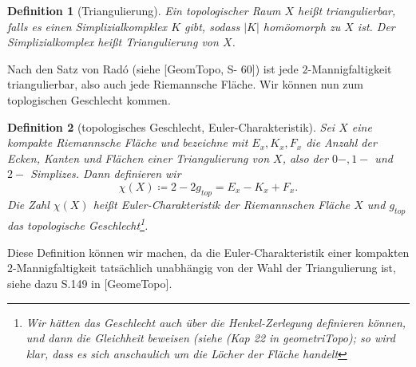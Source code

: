 \documentclass[11pt,a4paper,toc=bibliography]{scrartcl}
\theoremstyle{thm}
\theoremstyle{def}
\newtheorem{defi}{Definition}[section]
\theoremstyle{remark}
\begin{document}
\begin{defi}[Triangulierung]
Ein topologischer Raum $X$ heißt \emph{triangulierbar}, falls es einen Simplizialkompklex $K$ gibt, sodass $|K|$ homöomorph zu $X$ ist. Der Simplizialkomplex heißt \emph{Triangulierung} von $X$.
\end{defi}
Nach den Satz von Radó (siehe [GeomTopo, S- 60]) ist jede $2$-Mannigfaltigkeit triangulierbar, also auch jede Riemannsche Fläche. Wir können nun zum toplogischen Geschlecht kommen.
\begin{defi}[topologisches Geschlecht, Euler-Charakteristik]
Sei $X$ eine kompakte Riemannsche Fläche und bezeichne mit $E_x,K_x,F_x$ die Anzahl der Ecken, Kanten und Flächen einer Triangulierung von $X$, also der $0-,1-$ und $2-$ Simplizes. Dann definieren wir
\[
\chi (X)\coloneqq 2-2g_{top}=E_x-K_x+F_x.
\]
Die Zahl $\chi(X)$ heißt \emph{Euler-Charakteristik} der Riemannschen Fläche $X$ und $g_{top}$ das \emph{topologische Geschlecht}\footnote{Wir hätten das Geschlecht auch über die Henkel-Zerlegung definieren können, und dann die Gleichheit beweisen (siehe (Kap 22 in geometriTopo); so wird klar, dass es sich anschaulich um die Löcher der Fläche handelt}.
\end{defi}
Diese Definition können wir machen, da die Euler-Charakteristik einer kompakten $2$-Mannigfaltigkeit tatsächlich unabhängig von der Wahl der Triangulierung ist, siehe dazu S.149 in [GeomeTopo]. 
\end{document}
